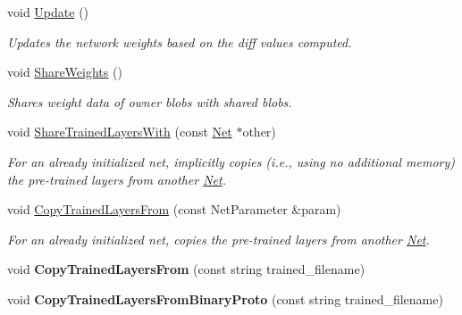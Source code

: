 \begin{DoxyCompactItemize}
\item 
void \hyperlink{classcaffe_1_1Net_a8a2544cefc59d6cbe1bf634f5d5be1c5}{Update} ()\hypertarget{classcaffe_1_1Net_a8a2544cefc59d6cbe1bf634f5d5be1c5}{}\label{classcaffe_1_1Net_a8a2544cefc59d6cbe1bf634f5d5be1c5}

\begin{DoxyCompactList}\small\item\em Updates the network weights based on the diff values computed. \end{DoxyCompactList}\item 
void \hyperlink{classcaffe_1_1Net_a4850fdb3eea1b04c97642546c0dcccf7}{Share\+Weights} ()
\begin{DoxyCompactList}\small\item\em Shares weight data of owner blobs with shared blobs. \end{DoxyCompactList}\item 
void \hyperlink{classcaffe_1_1Net_a3661ca5f30bf8e731cb54cfc3c320023}{Share\+Trained\+Layers\+With} (const \hyperlink{classcaffe_1_1Net}{Net} $\ast$other)\hypertarget{classcaffe_1_1Net_a3661ca5f30bf8e731cb54cfc3c320023}{}\label{classcaffe_1_1Net_a3661ca5f30bf8e731cb54cfc3c320023}

\begin{DoxyCompactList}\small\item\em For an already initialized net, implicitly copies (i.\+e., using no additional memory) the pre-\/trained layers from another \hyperlink{classcaffe_1_1Net}{Net}. \end{DoxyCompactList}\item 
void \hyperlink{classcaffe_1_1Net_a4ac2b69748470f54d530bc5dfa05b9c3}{Copy\+Trained\+Layers\+From} (const Net\+Parameter \&param)\hypertarget{classcaffe_1_1Net_a4ac2b69748470f54d530bc5dfa05b9c3}{}\label{classcaffe_1_1Net_a4ac2b69748470f54d530bc5dfa05b9c3}

\begin{DoxyCompactList}\small\item\em For an already initialized net, copies the pre-\/trained layers from another \hyperlink{classcaffe_1_1Net}{Net}. \end{DoxyCompactList}\item 
void {\bfseries Copy\+Trained\+Layers\+From} (const string trained\+\_\+filename)\hypertarget{classcaffe_1_1Net_ad5e222ad89011558cee681133e5c610b}{}\label{classcaffe_1_1Net_ad5e222ad89011558cee681133e5c610b}

\item 
void {\bfseries Copy\+Trained\+Layers\+From\+Binary\+Proto} (const string trained\+\_\+filename)\hypertarget{classcaffe_1_1Net_ad9bb09568db19316e9604eb8cbd15f6d}{}\label{classcaffe_1_1Net_ad9bb09568db19316e9604eb8cbd15f6d}


\end{DoxyCompactItemize}
